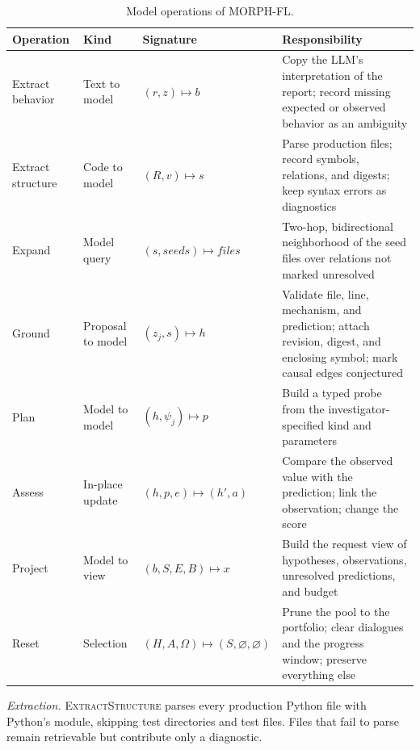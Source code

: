 \documentclass[letterpaper,journal]{IEEEtran}
\newcommand{\tool}{MORPH-FL}
\newcommand{\code}[1]{\texttt{\detokenize{#1}}}
\begin{document}
\begin{table}[t]
\caption{Model operations of \tool{}.}\label{tab:operations}
\centering\small\setlength{\tabcolsep}{3pt}
\renewcommand{\arraystretch}{1.12}
\begin{tabular}{@{}>{\raggedright\arraybackslash}p{}>{\raggedright\arraybackslash}p{}>{\raggedright\arraybackslash}p{}>{\raggedright\arraybackslash}p{}@{}}\toprule
Operation & Kind & Signature & Responsibility\\\midrule
Extract behavior & Text to model & $(r,z)\mapsto b$ & Copy the LLM's interpretation of the report; record missing expected or observed behavior as an ambiguity\\
Extract structure & Code to model & $(R,v)\mapsto s$ & Parse production files; record symbols, relations, and digests; keep syntax errors as diagnostics\\
Expand & Model query & $(s,\textit{seeds})\mapsto\textit{files}$ & Two-hop, bidirectional neighborhood of the seed files over relations not marked unresolved\\
Ground & Proposal to model & $(z_j,s)\mapsto h$ & Validate file, line, mechanism, and prediction; attach revision, digest, and enclosing symbol; mark causal edges conjectured\\
Plan & Model to model & $(h,\psi_j)\mapsto p$ & Build a typed probe from the investigator-specified kind and parameters\\
Assess & In-place update & $(h,p,e)\mapsto(h',a)$ & Compare the observed value with the prediction; link the observation; change the score\\
Project & Model to view & $(b,S,E,B)\mapsto x$ & Build the request view of hypotheses, observations, unresolved predictions, and budget\\
Reset & Selection & $(H,A,\Omega)\mapsto(S,\varnothing,\varnothing)$ & Prune the pool to the portfolio; clear dialogues and the progress window; preserve everything else\\
\bottomrule\end{tabular}
\end{table}

\emph{Extraction.} \textsc{ExtractStructure} parses every production Python file with Python's \code{ast} module, skipping test directories and test files. Files that fail to parse remain retrievable but contribute only a diagnostic.
\end{document}
